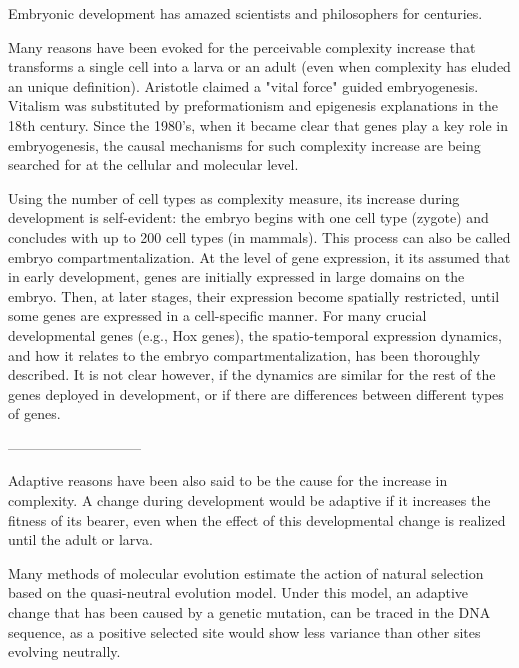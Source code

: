 
Embryonic development has amazed scientists and philosophers for centuries.

Many reasons have been evoked for the perceivable complexity increase that transforms a single cell into a larva or an adult (even when complexity has eluded an unique definition).
Aristotle claimed a "vital force" guided embryogenesis. %
Vitalism was substituted by preformationism and epigenesis explanations in the 18th century.
%
Since the 1980's, when it became clear that genes play a key role in embryogenesis, 
the causal mechanisms for such complexity increase are being searched for at the cellular and molecular level.

Using the number of cell types as complexity measure, its increase during development is self-evident: the embryo begins with one cell type (zygote) and concludes with up to 200 cell types (in mammals). 
This process can also be called embryo compartmentalization.
At the level of gene expression, it its assumed that in early development, genes are initially expressed in large domains on the embryo. Then, at later stages, their expression become spatially restricted, until some genes are expressed in a cell-specific manner.
%
For many crucial developmental genes (e.g., Hox genes), the spatio-temporal expression dynamics, and how it relates to the embryo compartmentalization, has been thoroughly described.
It is not clear however, if the dynamics are similar for the rest of the genes deployed in development, or if there are differences between different types of genes.

-----------------------------

Adaptive reasons have been also said to be the cause for the increase in complexity.
A change during development would be adaptive if it increases the fitness of its bearer, even when the effect of this developmental change is realized until the adult or larva.

Many methods of molecular evolution estimate the action of natural selection based on the quasi-neutral evolution model.
Under this model, an adaptive change that has been caused by a genetic mutation, can be traced in the DNA sequence, as a positive selected site would show less variance than other sites evolving neutrally.

